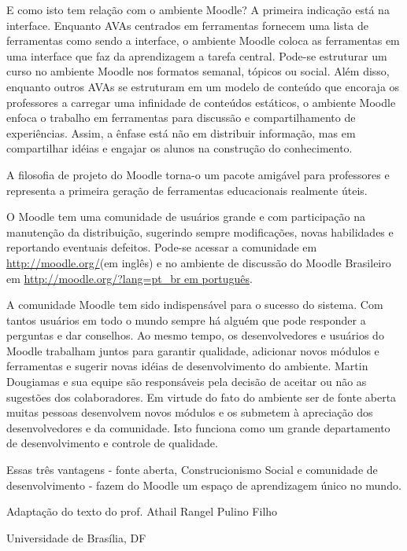 E como isto tem relação com o ambiente Moodle? A primeira indicação está na interface. Enquanto AVAs centrados em ferramentas fornecem uma lista de ferramentas como sendo a interface, o ambiente Moodle coloca as ferramentas em uma interface que faz da aprendizagem a tarefa central. Pode-se estruturar um curso no ambiente Moodle nos formatos semanal, tópicos ou social. Além disso, enquanto outros AVAs se estruturam em um modelo de conteúdo que encoraja os professores a carregar uma infinidade de conteúdos estáticos, o ambiente Moodle enfoca o trabalho em ferramentas para discussão e compartilhamento de experiências. Assim, a ênfase está não em distribuir informação, mas em compartilhar idéias e engajar os alunos na construção do conhecimento.

A filosofia de projeto do Moodle torna-o um pacote amigável para professores e representa a primeira geração de ferramentas educacionais realmente úteis.

O Moodle tem uma comunidade de usuários grande e com participação na manutenção da distribuição, sugerindo sempre modificações, novas habilidades e reportando eventuais defeitos. Pode-se acessar a comunidade em  \url{http://moodle.org/}(em inglês) e no ambiente de discussão do Moodle Brasileiro em \url{http://moodle.org/?lang=pt_br em português}.

A comunidade Moodle tem sido indispensável para o sucesso do sistema. Com tantos usuários em todo o mundo sempre há alguém que pode responder a perguntas e dar conselhos. Ao mesmo tempo, os desenvolvedores e usuários do Moodle trabalham juntos para garantir qualidade, adicionar novos módulos e ferramentas e sugerir novas idéias de desenvolvimento do ambiente. Martin Dougiamas e sua equipe são responsáveis pela decisão de aceitar ou não as sugestões dos colaboradores. Em virtude do fato do ambiente ser de fonte aberta muitas pessoas desenvolvem novos módulos e os submetem à apreciação dos desenvolvedores e da comunidade. Isto funciona como um grande departamento de desenvolvimento e controle de qualidade.

Essas três vantagens - fonte aberta, Construcionismo Social e comunidade de desenvolvimento - fazem do Moodle um espaço de aprendizagem único no mundo.

                                                     \begin{flushright}Adaptação do texto do prof. Athail Rangel Pulino Filho
                                                      
                                                                                 Universidade de Brasília, DF\end{flushright} 
                                                                                 

